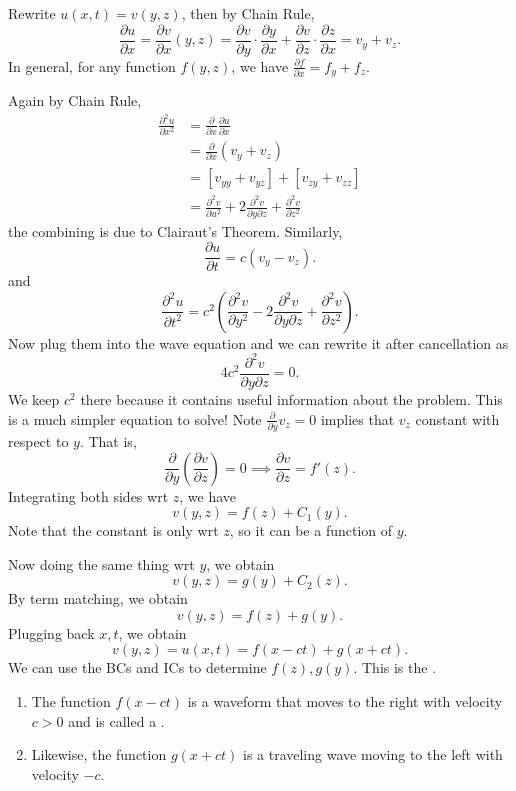 \documentclass[class=article,crop=false]{standalone}
\begin{document}
Rewrite $ u(x,t)= v(y,z)$, then by Chain Rule,
 \[
	 \frac{\partial u}{\partial x} = \frac{\partial v}{\partial x} (y,z) = \frac{\partial v}{\partial y} \cdot \frac{\partial y}{\partial x} + \frac{\partial v}{\partial z} \cdot \frac{\partial z}{\partial x} = v_y + v_z
.\]
In general, for any function $ f(y,z)$, we have  $ \frac{\partial f}{\partial x} = f_y+ f_z$.

Again by Chain Rule,
\begin{align*}
	\frac{\partial^2 u}{\partial { x}^2} &= \frac{\partial }{\partial x} \frac{\partial u}{\partial x}  \\
					     &= \frac{\partial }{\partial x} (v_y + v_z)  \\
					     &= [v_{yy}+ v_{yz}] + [v_{zy}+ v_{zz}]\\
					     &=  \frac{\partial^2 v}{\partial { u}^2} + 2 \frac{\partial^2 v}{\partial { y} \partial z} + \frac{\partial^2 v}{\partial { z}^2}  
\end{align*}
the combining is due to Clairaut's Theorem. Similarly,
\[
	\frac{\partial u}{\partial t} = c(v_y - v_z)
.\] 
and
\[
	\frac{\partial^2 u}{\partial { t}^2} = c^2 \left( \frac{\partial^2 v}{\partial { y}^2} - 2 \frac{\partial^2 v}{\partial { y} \partial z} + \frac{\partial^2 v}{\partial { z}^2}  \right) 
.\] 
Now plug them into the wave equation and we can rewrite it after cancellation as
\[
4 c^2 \frac{\partial^2 v}{\partial { y} \partial z} =  0
.\]
We keep $ c^2$ there because it contains useful information about the problem. This is a much simpler equation to solve! Note $ \frac{\partial }{\partial y} v_z = 0$ implies that $ v_z$ constant with respect to $ y$. That is,
 \[
	 \frac{\partial }{\partial y} \left( \frac{\partial v}{\partial z}  \right) =0 \implies \frac{\partial v}{\partial z} = f'(z)
.\]
Integrating both sides wrt $ z$, we have
 \[
	 v(y,z) = f(z) + C_1(y)
.\] 
Note that the constant is only wrt $ z$, so it can be a function of  $ y$.

Now doing the same thing wrt  $ y$, we obtain
 \[
	 v(y,z) = g(y) + C_2(z)
.\] 
By term matching, we obtain
\[
	v(y,z) = f(z) + g(y)
.\] 
Plugging back $ x,t$, we obtain
 \[
	 v(y,z) = u(x,t) = f(x-ct)+ g(x+ct)
.\] 
We can use the BCs and ICs to determine $ f(z), g(y)$. This is the  .

\begin{defn}
\begin{enumerate}[label=\arabic*)]
	\item The function $ f(x-ct)$ is a waveform that moves to the right with velocity $ c>0$ and is called a .
	\item Likewise, the function $ g(x+ct)$ is a traveling wave moving to the left with velocity  $ -c$.
\end{enumerate}
\end{defn}
\end{document}
